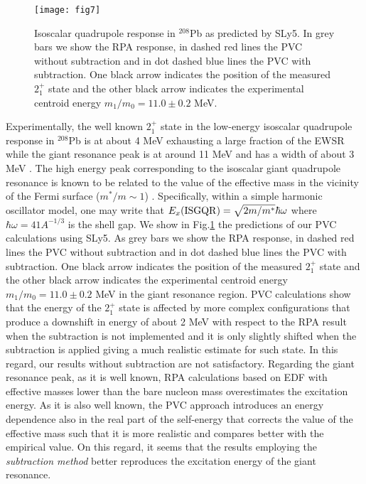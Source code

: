 \documentclass[12pt,a4paper,final]{iopart}
\begin{document}
\begin{figure}[t!]                    
\centerline{\texttt{[image: fig7]}}
\caption{Isoscalar quadrupole response in ${}^{208}$Pb as predicted by SLy5. In grey bars we show the RPA response, in dashed red lines the PVC without subtraction and in dot dashed blue lines the PVC with subtraction. One black arrow indicates the position of the measured $2_1^+$ state and the other black arrow indicates the experimental centroid energy $m_1/m_0=11.0\pm 0.2$ MeV\cite{youngblood1981}.} 
\label{fig7} 
\end{figure}

Experimentally, the well known $2_1^+$ state in the low-energy isoscalar quadrupole response in ${}^{208}$Pb is at about 4 MeV exhausting a large fraction of the EWSR while the giant resonance peak is at around 11 MeV and has a width of about 3 MeV \cite{harakeh2001}. The high energy peak corresponding to the isoscalar giant quadrupole resonance is known to be related to the value of the effective mass in the vicinity of the Fermi surface ($m^*/m \sim 1$) \cite{BMbook}. Specifically, within a simple harmonic oscillator model, one may write that $E_x({\rm ISGQR}) = \sqrt{2m/m^*}\hbar\omega$ where $\hbar\omega=41 A^{-1/3}$ is the shell gap. We show in Fig.\ref{fig7} the predictions of our PVC calculations using SLy5. As grey bars we show the RPA response, in dashed red lines the PVC without subtraction and in dot dashed blue lines the PVC with subtraction. One black arrow indicates the position of the measured $2_1^+$ state and the other black arrow indicates the experimental centroid energy $m_1/m_0=11.0\pm 0.2$ MeV in the giant resonance region\cite{youngblood1981}. PVC calculations show that the energy of the $2_1^+$ state is affected by more complex configurations that produce a downshift in energy of about 2 MeV with respect to the RPA result when the subtraction is not implemented and it is only slightly shifted when the subtraction is applied giving a much realistic estimate for such state. In this regard, our results without subtraction are not satisfactory. Regarding the giant resonance peak, as it is well known, RPA calculations based on EDF with effective masses lower than the bare nucleon mass overestimates the excitation energy. As it is also well known, the PVC approach introduces an energy dependence also in the real part of the self-energy that corrects the value of the effective mass \cite{bertsch1968} such that it is more realistic and compares better with the empirical value. On this regard, it seems that the results employing the {\it subtraction method} better reproduces the excitation energy of the giant resonance. 
\end{document}
